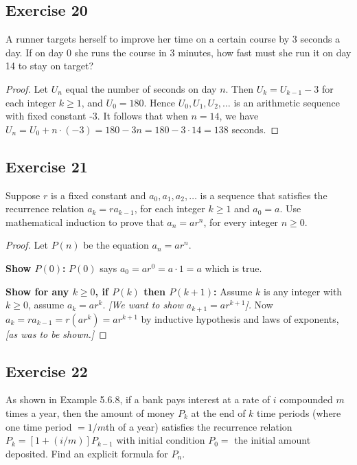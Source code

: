 \documentclass[14pt]{extarticle}
\begin{document}
\subsection{Exercise 20}
A runner targets herself to improve her time on a certain course by 3 seconds a day. If on day 0 she runs the course 
in 3 minutes, how fast must she run it on day 14 to stay on target?

\begin{proof}
Let \(U_n\) equal the number of seconds on day $n$. Then \(U_k = U_{k-1} - 3\) for each integer \(k \geq 1\), 
and \(U_0 = 180\). Hence \(U_0, U_1, U_2, \ldots\) is an arithmetic sequence with fixed constant -3. It follows that 
when \(n = 14\), we have \(U_n = U_0 + n \cdot (-3) = 180 - 3n = 180 - 3 \cdot 14 = 138\) seconds.
\end{proof}

\subsection{Exercise 21}
Suppose $r$ is a fixed constant and \(a_0, a_1, a_2, \ldots\) is a sequence that satisfies the recurrence 
relation \(a_k = r a_{k-1}\), for each integer \(k \geq 1\) and \(a_0 = a\). Use mathematical induction to prove that 
\(a_n = a r^n\), for every integer \(n \geq 0\).

\begin{proof}
Let $P(n)$ be the equation \(a_n = a r^n\).

{\bf Show $P(0)$:} $P(0)$ says \(a_0 = a r^0 = a \cdot 1 = a\) which is true.

{\bf Show for any \(k \geq 0\), if $P(k)$ then $P(k+1)$:}
Assume $k$ is any integer with \(k \geq 0\), assume \(a_k = a r^k\). {\it [We want to show \(a_{k+1} = ar^{k+1}\)].}
Now \(a_k = r a_{k-1} = r(ar^k) = ar^{k+1}\) by inductive hypothesis and laws of exponents, {\it [as was to be shown.]}
\end{proof}

\subsection{Exercise 22}
As shown in Example 5.6.8, if a bank pays interest at a rate of $i$ compounded $m$ times a year, then the amount of 
money $P_k$ at the end of $k$ time periods (where one time period \(= 1/m\)th of a year) satisfies the recurrence 
relation \(P_k = [1 + (i/m)] P_{k-1}\) with initial condition \(P_0 =\) the initial amount deposited. 
Find an explicit formula for $P_n$.
\end{document}

